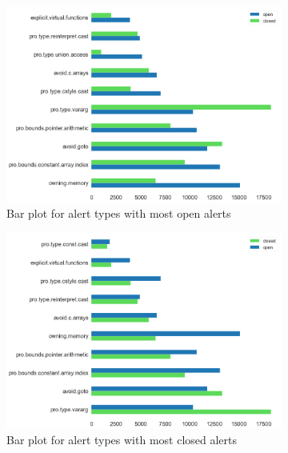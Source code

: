 \begin{figure}[H]
	\begin{subfigure}{0.5\textwidth}
		\centering
		\includegraphics[scale=0.2]{./src/data_analysis/most_open_alerts.png}
		\caption{Bar plot for alert types with most open alerts}
	\end{subfigure}%
	\begin{subfigure}{0.5\textwidth}
		\centering
		\includegraphics[scale=0.2]{./src/data_analysis/most_closed_alerts.png}
		\caption{Bar plot for alert types with most closed alerts}
	\end{subfigure}
	\caption{}
	\label{most_open_alerts}
\end{figure}


